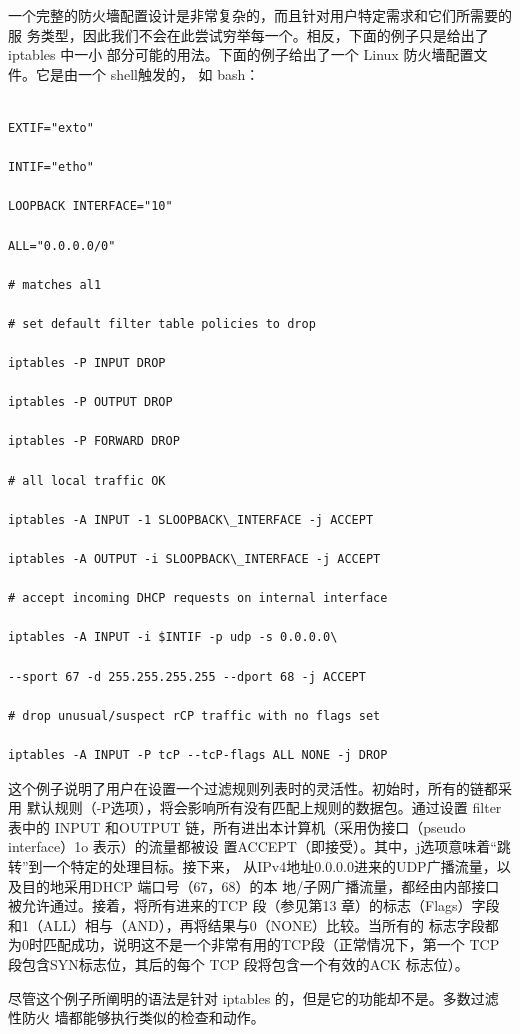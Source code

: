 一个完整的防火墻配置设计是非常复杂的，而且针对用户特定需求和它们所需要的服
务类型，因此我们不会在此尝试穷举每一个。相反，下面的例子只是给出了 iptables 中一小
部分可能的用法。下面的例子给出了一个 Linux 防火墻配置文件。它是由一个 shell触发的，
如 bash：

\begin{verbatim}
    
EXTIF="exto"

INTIF="etho"

LOOPBACK INTERFACE="10"

ALL="0.0.0.0/0"

# matches al1

# set default filter table policies to drop

iptables -P INPUT DROP

iptables -P OUTPUT DROP

iptables -P FORWARD DROP

# all local traffic OK

iptables -A INPUT -1 SLOOPBACK\_INTERFACE -j ACCEPT

iptables -A OUTPUT -i SLOOPBACK\_INTERFACE -j ACCEPT

# accept incoming DHCP requests on internal interface

iptables -A INPUT -i $INTIF -p udp -s 0.0.0.0\

--sport 67 -d 255.255.255.255 --dport 68 -j ACCEPT

# drop unusual/suspect rCP traffic with no flags set

iptables -A INPUT -P tcP --tcP-flags ALL NONE -j DROP
\end{verbatim}

这个例子说明了用户在设置一个过滤规则列表时的灵活性。初始时，所有的链都采用
默认规则（-P选项），将会影响所有没有匹配上规则的数据包。通过设置 filter 表中的 INPUT
和OUTPUT 链，所有进出本计算机（采用伪接口（pseudo interface）1o 表示）的流量都被设
置ACCEPT（即接受）。其中，j选项意味着“跳转”到一个特定的处理目标。接下来，
从IPv4地址0.0.0.0进来的UDP广播流量，以及目的地采用DHCP 端口号（67，68）的本
地/子网广播流量，都经由内部接口被允许通过。接着，将所有进来的TCP 段（参见第13
章）的标志（Flags）字段和1（ALL）相与（AND），再将结果与0（NONE）比较。当所有的
标志字段都为0时匹配成功，说明这不是一个非常有用的TCP段（正常情况下，第一个 TCP
段包含SYN标志位，其后的每个 TCP 段将包含一个有效的ACK 标志位）。

尽管这个例子所阐明的语法是针对 iptables 的，但是它的功能却不是。多数过滤性防火
墙都能够执行类似的检查和动作。

